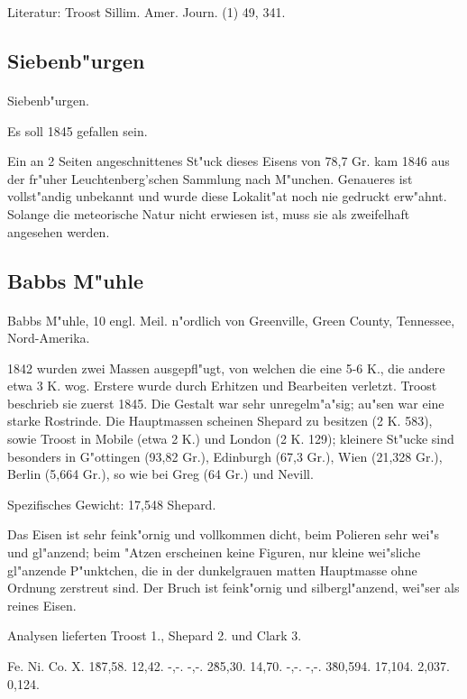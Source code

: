 \documentclass[a4paper, 11pt, oneside]{article}
\begin{document}
Literatur: Troost Sillim. Amer. Journ. (1) 49, 341.

\subsection{Siebenb"urgen}
\normalsize
\paragraph{}
Siebenb"urgen.

Es soll 1845 gefallen sein.

Ein an 2 Seiten angeschnittenes St"uck dieses Eisens von 78,7 Gr. kam 1846 aus der fr"uher Leuchtenberg'schen Sammlung nach M"unchen. Genaueres ist vollst"andig unbekannt und wurde diese Lokalit"at noch nie gedruckt erw"ahnt. Solange die meteorische Natur nicht erwiesen ist, muss sie als zweifelhaft angesehen werden.

\subsection{Babbs M"uhle}
\paragraph{}
Babbs M"uhle, 10 engl. Meil. n"ordlich von Greenville, Green County, Tennessee, Nord-Amerika.

1842 wurden zwei Massen ausgepfl"ugt, von welchen die eine 5-6 K., die andere etwa 3 K. wog. Erstere wurde durch Erhitzen und Bearbeiten verletzt. Troost beschrieb sie zuerst 1845. Die Gestalt war sehr unregelm"a"sig; au"sen war eine starke Rostrinde. Die Hauptmassen scheinen Shepard zu besitzen (2 K. 583), sowie Troost in Mobile (etwa 2 K.) und London (2 K. 129); kleinere St"ucke sind besonders in G"ottingen (93,82 Gr.), Edinburgh (67,3 Gr.), Wien (21,328 Gr.), Berlin (5,664 Gr.), so wie bei Greg (64 Gr.) und Nevill.

Spezifisches Gewicht: 17,548 Shepard.

Das Eisen ist sehr feink"ornig und vollkommen dicht, beim Polieren sehr wei"s und gl"anzend; beim "Atzen erscheinen keine Figuren, nur kleine wei"sliche gl"anzende P"unktchen, die in der dunkelgrauen matten Hauptmasse ohne Ordnung zerstreut sind. Der Bruch ist feink"ornig und silbergl"anzend, wei"ser als reines Eisen.

Analysen lieferten Troost 1., Shepard 2. und Clark 3.

Fe. Ni. Co. X.  
1\. 87,58. 12,42. -,-. -,-.  
2\. 85,30. 14,70. -,-. -,-.  
3\. 80,594. 17,104. 2,037. 0,124.
\end{document}
